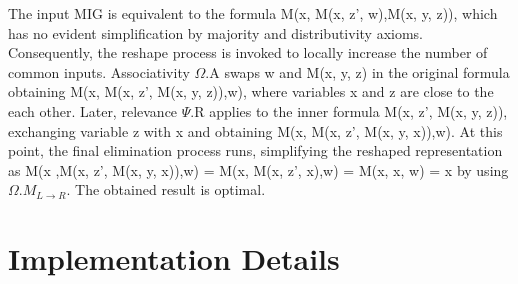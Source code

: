 \documentclass[
	accentcolor=1c,%
	type=intern,
	marginpar=false,
	ruledheaders=section,
	class=report,
	BCOR=5mm,
      parskip=half-,
	fontsize=10pt
	]{tudapub}
\begin{document}
	The input MIG is equivalent to the formula M(x, M(x, z', w),M(x, y, z)), which has no evident simplification by majority and distributivity axioms. Consequently, the reshape process is invoked to locally increase the number of common inputs. Associativity $\Omega$.A swaps w and M(x, y, z) in the original formula obtaining M(x, M(x, z', M(x, y, z)),w), where variables x and z are close to the each other. Later, relevance $\Psi$.R applies to the inner formula M(x, z', M(x, y, z)), exchanging variable z with x and obtaining M(x, M(x, z', M(x, y, x)),w). At this point, the final elimination process runs, simplifying the reshaped representation as M(x ,M(x, z', M(x, y, x)),w) = M(x, M(x, z', x),w) = M(x, x, w) = x by using $\Omega.M_{L\rightarrow R}$. The obtained result is optimal.


	\section{Implementation Details}
\end{document}
